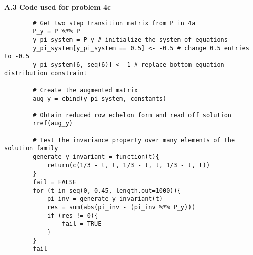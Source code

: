 \documentclass[11pt, letterpaper]{article}
\begin{document}
    {\bf A.3 Code used for problem 4c}
    \begin{verbatim}
        # Get two step transition matrix from P in 4a
        P_y = P %*% P
        y_pi_system = P_y # initialize the system of equations
        y_pi_system[y_pi_system == 0.5] <- -0.5 # change 0.5 entries to -0.5
        y_pi_system[6, seq(6)] <- 1 # replace bottom equation distribution constraint

        # Create the augmented matrix
        aug_y = cbind(y_pi_system, constants)

        # Obtain reduced row echelon form and read off solution
        rref(aug_y)

        # Test the invariance property over many elements of the solution family 
        generate_y_invariant = function(t){
            return(c(1/3 - t, t, 1/3 - t, t, 1/3 - t, t))
        }
        fail = FALSE
        for (t in seq(0, 0.45, length.out=1000)){
            pi_inv = generate_y_invariant(t) 
            res = sum(abs(pi_inv - (pi_inv %*% P_y)))
            if (res != 0){
                fail = TRUE
            }
        }
        fail
    \end{verbatim}
\end{document}
